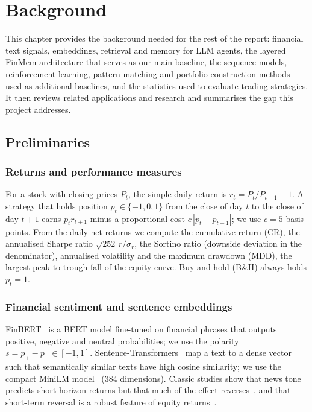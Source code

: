 \chapter{Background}
\label{ch:back}

This chapter provides the background needed for the rest of the report: financial text signals, embeddings, retrieval and memory for LLM agents, the layered FinMem architecture that serves as our main baseline, the sequence models, reinforcement learning, pattern matching and portfolio-construction methods used as additional baselines, and the statistics used to evaluate trading strategies. It then reviews related applications and research and summarises the gap this project addresses.

\section{Preliminaries}

\subsection{Returns and performance measures}
For a stock with closing prices $P_t$, the simple daily return is $r_t = P_t/P_{t-1}-1$. A strategy that holds position $p_t\in\{-1,0,1\}$ from the close of day $t$ to the close of day $t+1$ earns $p_t r_{t+1}$ minus a proportional cost $c\,|p_t-p_{t-1}|$; we use $c=5$ basis points. From the daily net returns we compute the cumulative return (CR), the annualised Sharpe ratio $\sqrt{252}\,\bar r/\sigma_r$, the Sortino ratio (downside deviation in the denominator), annualised volatility and the maximum drawdown (MDD), the largest peak-to-trough fall of the equity curve. Buy-and-hold (B\&H) always holds $p_t=1$.

\subsection{Financial sentiment and sentence embeddings}
FinBERT~\cite{araci2019finbert} is a BERT model fine-tuned on financial phrases that outputs positive, negative and neutral probabilities; we use the polarity $s = p_{+}-p_{-}\in[-1,1]$. Sentence-Transformers~\cite{reimers2019sbert} map a text to a dense vector such that semantically similar texts have high cosine similarity; we use the compact MiniLM model~\cite{wang2020minilm} (384 dimensions). Classic studies show that news tone predicts short-horizon returns but that much of the effect reverses~\cite{tetlock2007giving,chan2003stock}, and that short-term reversal is a robust feature of equity returns~\cite{jegadeesh1990evidence}.

